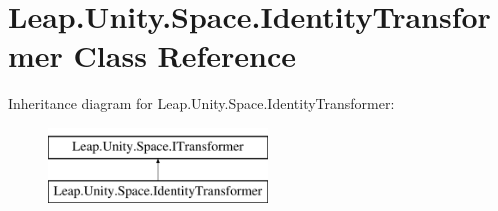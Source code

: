\hypertarget{class_leap_1_1_unity_1_1_space_1_1_identity_transformer}{}\section{Leap.\+Unity.\+Space.\+Identity\+Transformer Class Reference}
\label{class_leap_1_1_unity_1_1_space_1_1_identity_transformer}
Inheritance diagram for Leap.\+Unity.\+Space.\+Identity\+Transformer\+:\begin{figure}[H]
\begin{center}
\leavevmode
\includegraphics[height=2.000000cm]{class_leap_1_1_unity_1_1_space_1_1_identity_transformer}
\end{center}
\end{figure}

